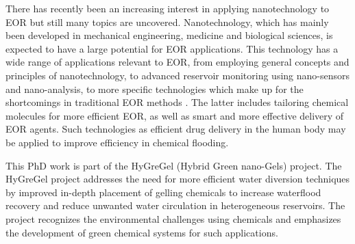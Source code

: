 There has recently been an increasing interest in applying nanotechnology to EOR but still many topics are uncovered. Nanotechnology,  which has mainly been developed in mechanical engineering, medicine and biological sciences, is expected to have a large potential for EOR applications. This technology has a wide range of applications relevant to EOR, from employing general concepts and principles of nanotechnology, to advanced reservoir monitoring using nano-sensors and nano-analysis, to more specific technologies which make up for the shortcomings in traditional EOR methods \citep{Fletcher2010, Ayatollahi2012, Cocuzza2011}. The latter includes tailoring chemical molecules for more efficient EOR, as well as smart and more effective delivery of EOR agents. Such technologies as efficient drug delivery in the human body may be applied to improve efficiency in chemical flooding.

This PhD work is part of the HyGreGel (Hybrid Green nano-Gels) project. The HyGreGel project addresses the need for more efficient water diversion techniques by improved in-depth placement of gelling chemicals to increase waterflood recovery and reduce unwanted water circulation in heterogeneous reservoirs. The project recognizes the environmental challenges using chemicals and emphasizes the development of green chemical systems for such applications.